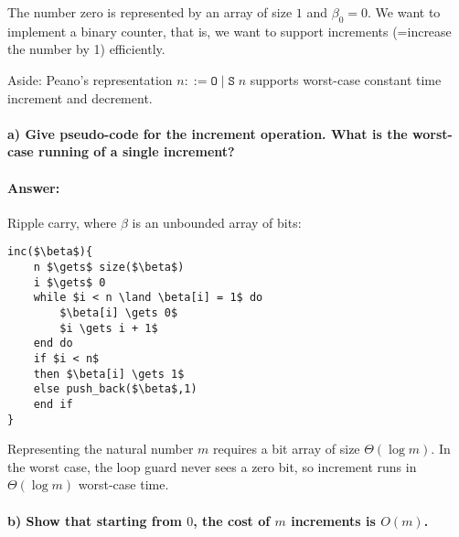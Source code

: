 \documentclass[a4paper]{article}
\begin{document}
\noindent The number zero is represented by an array of size $1$ and $\beta_0 = 0$. We want to implement a binary counter, that is, we want to support increments (=increase the number by 1) efficiently.

Aside:
Peano's representation $n ::= \texttt{O} \mid \texttt{S}\;n$ supports worst-case constant time increment and decrement.

\paragraph{a) Give pseudo-code for the increment operation. What is the worst-case running of a single increment?}

\paragraph{Answer:}
Ripple carry, where $\beta$ is an unbounded array of bits:
\begin{lstlisting}[xleftmargin=2cm]
inc($\beta$){
    n $\gets$ size($\beta$)
    i $\gets$ 0
    while $i < n \land \beta[i] = 1$ do
        $\beta[i] \gets 0$
        $i \gets i + 1$
    end do
    if $i < n$
    then $\beta[i] \gets 1$
    else push_back($\beta$,1)
    end if
}
\end{lstlisting}
Representing the natural number $m$ requires a bit array of size $\Theta(\log m)$.
In the worst case, the loop guard never sees a zero bit, so increment runs in $\Theta(\log m)$ worst-case time.

\paragraph{b) Show that starting from $0$, the cost of $m$ increments is $O(m)$.}
\end{document}
